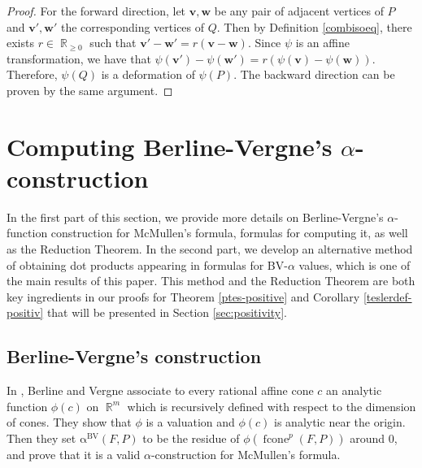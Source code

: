 \documentclass[12pt]{amsart}
\numberwithin{equation}{section}
\theoremstyle{definition}
\def\fcone{\operatorname{fcone}}
\def\bv{{\boldsymbol{v}}}
\def\bw{{\boldsymbol{w}}}
\def\bvalpha{\operatorname{\alpha^{BV}}}
\def\R{\operatorname{\mathbb{R}}}
\begin{document}
\begin{proof}
  For the forward direction, let $\bv , \bw$ be any pair of adjacent vertices of $P$ and $\bv', \bw'$ the corresponding vertices of $Q$. Then by Definition \ref{combisoeq}, there exists $r \in \R_{\ge 0}$ such that $\bv'-\bw'=r(\bv-\bw)$. Since $\psi$ is an affine transformation, we have that $\psi(\bv')-\psi(\bw')=r(\psi(\bv)-\psi(\bw))$. Therefore, $\psi(Q)$ is a deformation of $\psi(P)$. The backward direction can be proven by the same argument.
\end{proof}


\section{Computing Berline-Vergne's $\alpha$-construction} \label{sec:bv}

In the first part of this section, we provide more details on Berline-Vergne's $\alpha$-function construction for McMullen's formula, formulas for computing it, as well as the Reduction Theorem. 
In the second part, we develop an alternative method of obtaining dot products appearing in formulas for BV-$\alpha$ values, which is one of the main results of this paper. This method and the Reduction Theorem are both key ingredients in our proofs for Theorem \ref{ptes-positive} and Corollary \ref{teslerdef-positiv} that will be presented in Section \ref{sec:positivity}.

\subsection{Berline-Vergne's construction} 
In \cite{berline2007local}, Berline and Vergne associate to every rational affine cone $c$ an analytic function $\phi(c)$ on $\R^{m}$ which is recursively defined with respect to the dimension of cones. They show that $\phi$ is a valuation and $\phi(c)$ is analytic near the origin. Then they set $\bvalpha(F,P)$ to be the residue of $\phi(\fcone^{p}(F,P))$ around $0$, and prove that it is a valid $\alpha$-construction for McMullen's formula. 
\end{document}
